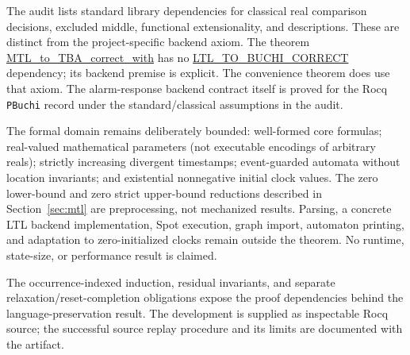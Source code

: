 \documentclass{ieeeaccess}
\newcommand{\Rocqid}[1]{\url{#1}}
\begin{document}
The audit lists standard library dependencies for classical real comparison
decisions, excluded middle, functional extensionality, and descriptions.
These are distinct from the project-specific backend axiom. The theorem
\Rocqid{MTL_to_TBA_correct_with} has no
\Rocqid{LTL_TO_BUCHI_CORRECT} dependency; its backend premise
is explicit. The convenience theorem does use that axiom. The alarm-response
backend contract itself is proved for the Rocq \texttt{PBuchi} record under
the standard/classical assumptions in the audit.

The formal domain remains deliberately bounded: well-formed core formulas;
real-valued mathematical parameters (not executable encodings of arbitrary
reals); strictly increasing divergent timestamps; event-guarded automata
without location invariants; and existential nonnegative initial clock
values. The zero lower-bound and zero strict upper-bound reductions described
in Section~\ref{sec:mtl} are preprocessing, not mechanized results. Parsing,
a concrete LTL backend implementation, Spot execution, graph import,
automaton printing, and adaptation to zero-initialized clocks remain outside
the theorem. No runtime, state-size, or performance result is claimed.

The occurrence-indexed induction, residual invariants, and separate
relaxation/reset-completion obligations expose the proof dependencies behind
the language-preservation result. The development is supplied as inspectable
Rocq source; the successful source replay procedure and its limits are
documented with the artifact.
\end{document}
